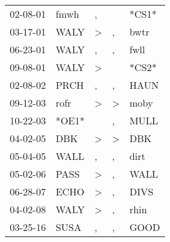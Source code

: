 \begin{supertabular}{lllll}
 02-08-01 &   fmwh &             , &               &  *CS1* \\
 03-17-01 &   WALY &  \textgreater &             , &   bwtr \\
 06-23-01 &   WALY &             , &             , &   fwll \\
 09-08-01 &   WALY &  \textgreater &               &  *CS2* \\
 02-08-02 &   PRCH &             , &             , &   HAUN \\
 09-12-03 &   rofr &  \textgreater &  \textgreater &   moby \\
 10-22-03 &  *OE1* &               &             , &   MULL \\
 04-02-05 &    DBK &  \textgreater &  \textgreater &    DBK \\
 05-04-05 &   WALL &             , &             , &   dirt \\
 05-02-06 &   PASS &  \textgreater &             , &   WALL \\
 06-28-07 &   ECHO &  \textgreater &             , &   DIVS \\
 04-02-08 &   WALY &  \textgreater &             , &   rhin \\
 03-25-16 &   SUSA &             , &             , &   GOOD \\
\end{supertabular}
